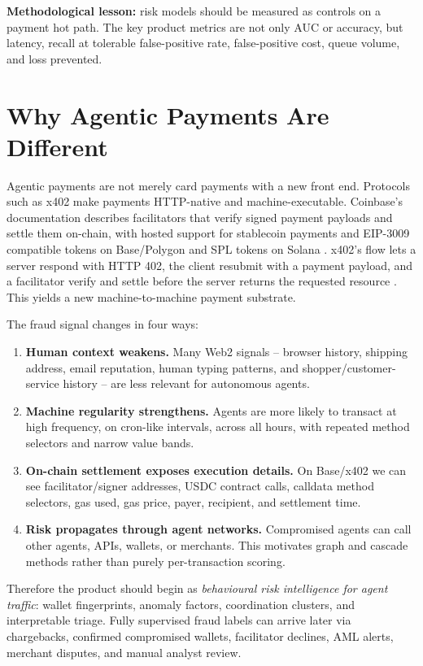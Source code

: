 \documentclass[11pt]{article}
\begin{document}
\textbf{Methodological lesson:} risk models should be measured as controls on a
payment hot path.  The key product metrics are not only AUC or accuracy, but
latency, recall at tolerable false-positive rate, false-positive cost,
queue volume, and loss prevented.

\section{Why Agentic Payments Are Different}

Agentic payments are not merely card payments with a new front end.  Protocols
such as x402 make payments HTTP-native and machine-executable.  Coinbase's
documentation describes facilitators that verify signed payment payloads and
settle them on-chain, with hosted support for stablecoin payments and EIP-3009
compatible tokens on Base/Polygon and SPL tokens on Solana \cite{x402Facilitator}.
x402's flow lets a server respond with HTTP 402, the client resubmit with a
payment payload, and a facilitator verify and settle before the server returns
the requested resource \cite{x402How}.  This yields a new machine-to-machine
payment substrate.

The fraud signal changes in four ways:

\begin{enumerate}
  \item \textbf{Human context weakens.} Many Web2 signals -- browser history,
        shipping address, email reputation, human typing patterns, and
        shopper/customer-service history -- are less relevant for autonomous
        agents.
  \item \textbf{Machine regularity strengthens.} Agents are more likely to
        transact at high frequency, on cron-like intervals, across all hours,
        with repeated method selectors and narrow value bands.
  \item \textbf{On-chain settlement exposes execution details.} On Base/x402
        we can see facilitator/signer addresses, USDC contract calls,
        calldata method selectors, gas used, gas price, payer, recipient, and
        settlement time.
  \item \textbf{Risk propagates through agent networks.} Compromised agents
        can call other agents, APIs, wallets, or merchants.  This motivates
        graph and cascade methods rather than purely per-transaction scoring.
\end{enumerate}

Therefore the product should begin as \emph{behavioural risk intelligence for
agent traffic}: wallet fingerprints, anomaly factors, coordination clusters,
and interpretable triage.  Fully supervised fraud labels can arrive later via
chargebacks, confirmed compromised wallets, facilitator declines, AML alerts,
merchant disputes, and manual analyst review.
\end{document}
